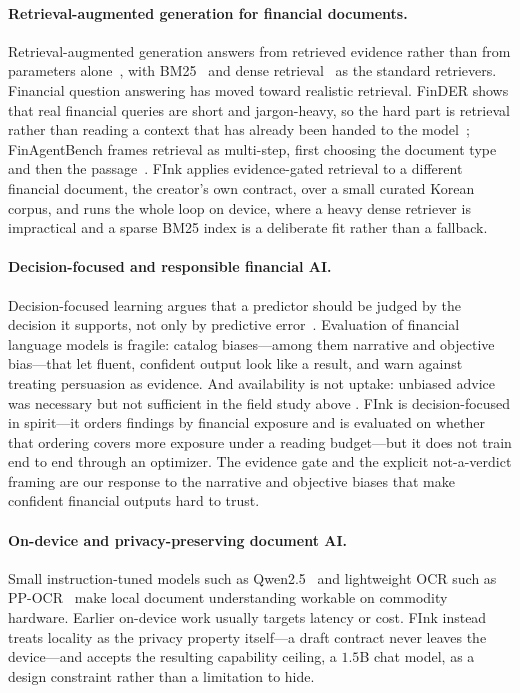\documentclass{article}
\theoremstyle{plain}
\begin{document}
\paragraph{Retrieval-augmented generation for financial documents.}
Retrieval-augmented generation answers from retrieved evidence rather than from
parameters alone~\citep{lewis2020rag}, with BM25~\citep{robertson2009bm25} and
dense retrieval~\citep{karpukhin2020dpr} as the standard retrievers. Financial
question answering has moved toward realistic retrieval. FinDER shows that real
financial queries are short and jargon-heavy, so the hard part is retrieval rather
than reading a context that has already been handed to the
model~\citep{choi2025finder}; FinAgentBench frames retrieval as multi-step, first
choosing the document type and then the passage~\citep{choi2025finagentbench}.
FInk applies evidence-gated retrieval to a different financial document, the
creator's own contract, over a small curated Korean corpus, and runs the whole
loop on device, where a heavy dense retriever is impractical and a sparse BM25
index is a deliberate fit rather than a fallback.

\paragraph{Decision-focused and responsible financial AI.}
Decision-focused learning argues that a predictor should be judged by the decision
it supports, not only by predictive error~\citep{elmachtoub2022spo}. Evaluation of
financial language models is fragile: \citet{kong2026bias} catalog biases---among
them narrative and objective bias---that let fluent, confident output look like a
result, and warn against treating persuasion as evidence. And availability is not
uptake: unbiased advice was necessary but not sufficient in the field study above
\citep{bhattacharya2012advice}. FInk is decision-focused in spirit---it orders
findings by financial exposure and is evaluated on whether that ordering covers
more exposure under a reading budget---but it does not train end to end through an
optimizer. The evidence gate and the explicit not-a-verdict framing are our
response to the narrative and objective biases that make confident financial
outputs hard to trust.

\paragraph{On-device and privacy-preserving document AI.}
Small instruction-tuned models such as Qwen2.5~\citep{qwen2024report} and
lightweight OCR such as PP-OCR~\citep{du2020ppocr} make local document
understanding workable on commodity hardware. Earlier on-device work usually
targets latency or cost. FInk instead treats locality as the privacy property
itself---a draft contract never leaves the device---and accepts the resulting
capability ceiling, a $1.5$B chat model, as a design constraint rather than a
limitation to hide.
\end{document}
